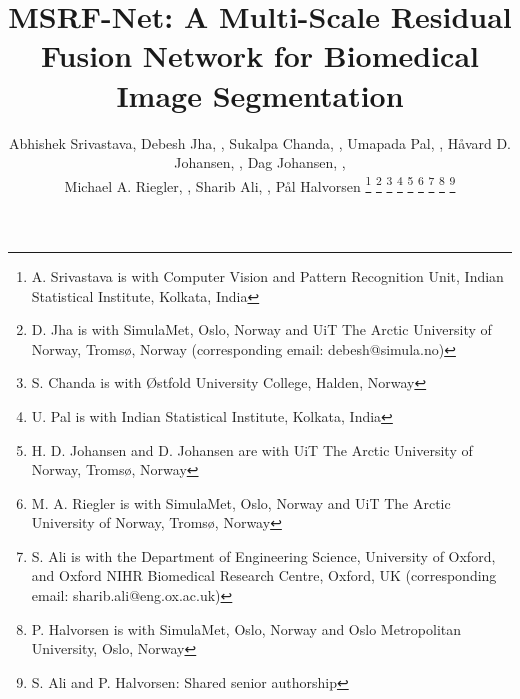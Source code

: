 \documentclass[journal,twoside,web]{IEEEtran}
\begin{document}
\title{MSRF-Net: A Multi-Scale Residual Fusion Network  for Biomedical Image Segmentation}
\author{Abhishek Srivastava,
        Debesh Jha, , 
       Sukalpa Chanda, ,
       Umapada Pal, ,
       H{\aa}vard D. Johansen, ,
       Dag Johansen, , \\
       Michael A. Riegler,  ,
       Sharib Ali, ,
       P{\aa}l Halvorsen 
\thanks{A. Srivastava is with  Computer Vision and Pattern Recognition Unit, Indian Statistical Institute, Kolkata, India}
\thanks{D. Jha is with SimulaMet, Oslo, Norway and UiT The Arctic University of Norway, Troms{\o}, Norway (corresponding email: debesh@simula.no)}
\thanks{S. Chanda is with Østfold University College, Halden, Norway}
\thanks{U. Pal is with Indian Statistical Institute, Kolkata, India}
\thanks{H. D. Johansen and D. Johansen are with UiT The Arctic University of Norway, Troms{\o}, Norway}
\thanks{M. A. Riegler is with SimulaMet, Oslo, Norway and UiT The Arctic University of Norway, Troms{\o}, Norway}
\thanks{S. Ali is with the Department of Engineering Science, University of Oxford, and Oxford NIHR Biomedical Research Centre, Oxford, UK (corresponding email: sharib.ali@eng.ox.ac.uk)}
\thanks{P. Halvorsen is with SimulaMet, Oslo, Norway and Oslo Metropolitan University, Oslo, Norway}
\thanks{S. Ali and P. Halvorsen: Shared senior authorship} 
}
\end{document}
